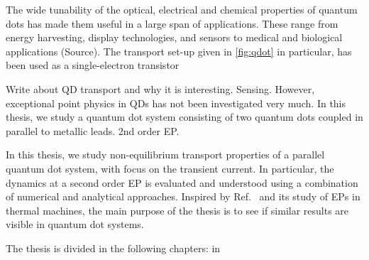 \documentclass[../main.tex]{subfiles}
\begin{document}
The wide tunability of the optical, electrical and chemical properties of quantum dots has made them useful in a large span of applications. These range from energy harvesting, display technologies, and sensors to medical and biological applications (Source). The transport set-up given in \cref{fig:qdot} in particular, has been used as a single-electron transistor

Write about QD transport and why it is interesting. Sensing. However, exceptional point physics in QDs has not been investigated very much. In this thesis, we study a quantum dot system consisting of two quantum dots coupled in parallel to metallic leads. 2nd order EP.

In this thesis, we study non-equilibrium transport properties of a parallel quantum dot system, with focus on the transient current. In particular, the dynamics at a second order EP is evaluated and understood using a combination of numerical and analytical approaches. Inspired by Ref.~\cite{thermal} and its study of EPs in thermal machines, the main purpose of the thesis is to see if similar results are visible in quantum dot systems. %

The thesis is divided in the following chapters: in 
\end{document}
